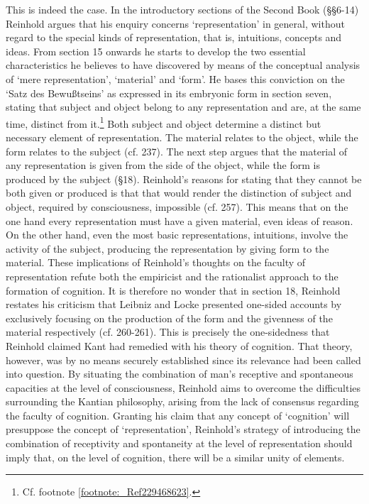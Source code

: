 This is indeed the case. In the introductory sections of the Second Book (\S \S  6{-}14) Reinhold argues that his enquiry concerns `representation' in general, without regard to the special kinds of representation, that is, intuitions, concepts and ideas. From section 15 onwards he starts to develop the two essential characteristics he believes to have discovered by means of the conceptual analysis of `mere representation', `material' and `form'. He bases this conviction on the `Satz des Bewu\ss{}tseins' as expressed in its embryonic form in section seven, stating that subject and object belong to any representation and are, at the same time, distinct from it.\footnote{ Cf. footnote \ref{footnote:_Ref229468623}. } Both subject and object determine a distinct but necessary element of representation. The material relates to the object, while the form relates to the subject (cf. 237). The next step argues that the material of any representation is given from the side of the object, while the form is produced by the subject (\S  18). Reinhold's reasons for stating that they cannot be both given or produced is that that would render the distinction of subject and object, required by consciousness, impossible (cf. 257). This means that on the one hand every representation must have a given material, even ideas of reason. On the other hand, even the most basic representations, intuitions, involve the activity of the subject, producing the representation by giving form to the material. These implications of Reinhold's thoughts on the faculty of representation refute both the empiricist and the rationalist approach to the formation of cognition. It is therefore no wonder that in section 18, Reinhold restates his criticism that Leibniz and Locke presented one{-}sided accounts by exclusively focusing on the production of the form and the givenness of the material respectively (cf. 260{-}261). This is precisely the one{-}sidedness that Reinhold claimed Kant had remedied with his theory of cognition. That theory, however, was by no means securely established since its relevance had been called into question. By situating the combination of man's receptive and spontaneous capacities at the level of consciousness, Reinhold aims to overcome the difficulties surrounding the Kantian philosophy, arising from the lack of consensus regarding the faculty of cognition. Granting his claim that any concept of `cognition' will presuppose the concept of `representation', Reinhold's strategy of introducing the combination of receptivity and spontaneity at the level of representation should imply that, on the level of cognition, there will be a similar unity of elements. 

